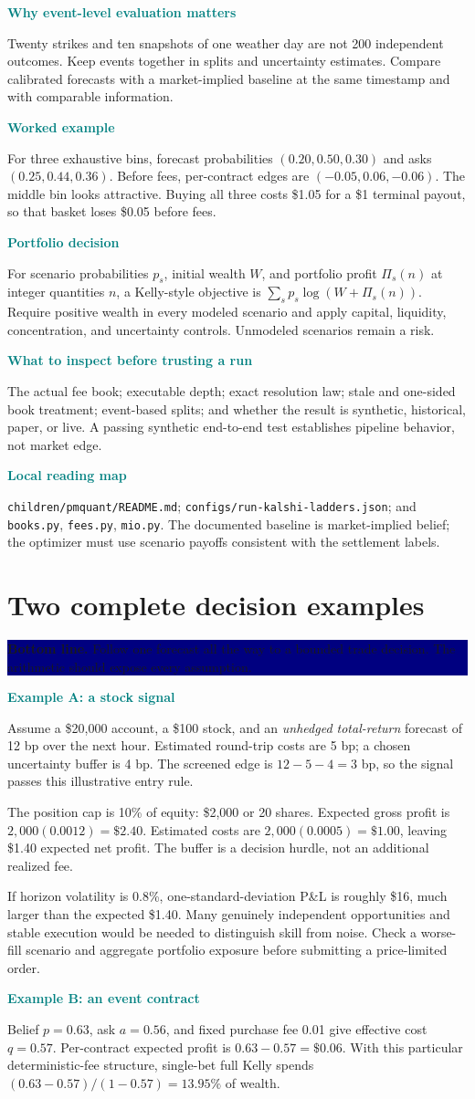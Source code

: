 \documentclass[10pt,letterpaper]{article}
\newcommand{\bl}[1]{\noindent\colorbox{navy}{\parbox{\dimexpr\linewidth-2\fboxsep}{\color{white}\textbf{Bottom line.} #1}}\par\medskip}
\newcommand{\topic}[2]{\clearpage\section{#1}\bl{#2}}
\newcommand{\sub}[1]{\par\textbf{\textcolor{teal}{#1}}\par}
\newcommand{\ex}[1]{\sub{Worked example}#1}
\begin{document}
\sub{Why event-level evaluation matters}
Twenty strikes and ten snapshots of one weather day are not 200 independent outcomes. Keep events together in splits and uncertainty estimates. Compare calibrated forecasts with a market-implied baseline at the same timestamp and with comparable information.
\ex{For three exhaustive bins, forecast probabilities $(0.20,0.50,0.30)$ and asks $(0.25,0.44,0.36)$. Before fees, per-contract edges are $(-0.05,0.06,-0.06)$. The middle bin looks attractive. Buying all three costs \$1.05 for a \$1 terminal payout, so that basket loses \$0.05 before fees.}
\sub{Portfolio decision}
For scenario probabilities $p_s$, initial wealth $W$, and portfolio profit $\Pi_s(n)$ at integer quantities $n$, a Kelly-style objective is $\sum_s p_s\log(W+\Pi_s(n))$. Require positive wealth in every modeled scenario and apply capital, liquidity, concentration, and uncertainty controls. Unmodeled scenarios remain a risk.
\sub{What to inspect before trusting a run}
The actual fee book; executable depth; exact resolution law; stale and one-sided book treatment; event-based splits; and whether the result is synthetic, historical, paper, or live. A passing synthetic end-to-end test establishes pipeline behavior, not market edge.
\sub{Local reading map}
\texttt{children/pmquant/README.md}; \texttt{configs/run-kalshi-ladders.json}; and \texttt{books.py}, \texttt{fees.py}, \texttt{mio.py}. The documented baseline is market-implied belief; the optimizer must use scenario payoffs consistent with the settlement labels.
\topic{Two complete decision examples}{Follow one forecast all the way to a bounded trade decision. The arithmetic should expose every assumption.}
\sub{Example A: a stock signal}
Assume a \$20,000 account, a \$100 stock, and an \emph{unhedged total-return} forecast of 12 bp over the next hour. Estimated round-trip costs are 5 bp; a chosen uncertainty buffer is 4 bp. The screened edge is $12-5-4=3$ bp, so the signal passes this illustrative entry rule.

The position cap is 10\% of equity: \$2,000 or 20 shares. Expected gross profit is $2{,}000(0.0012)=\$2.40$. Estimated costs are $2{,}000(0.0005)=\$1.00$, leaving \$1.40 expected net profit. The buffer is a decision hurdle, not an additional realized fee.

If horizon volatility is 0.8\%, one-standard-deviation P\&L is roughly \$16, much larger than the expected \$1.40. Many genuinely independent opportunities and stable execution would be needed to distinguish skill from noise. Check a worse-fill scenario and aggregate portfolio exposure before submitting a price-limited order.
\sub{Example B: an event contract}
Belief $p=0.63$, ask $a=0.56$, and fixed purchase fee 0.01 give effective cost $q=0.57$. Per-contract expected profit is $0.63-0.57=\$0.06$. With this particular deterministic-fee structure, single-bet full Kelly spends $(0.63-0.57)/(1-0.57)=13.95\%$ of wealth.
\end{document}
